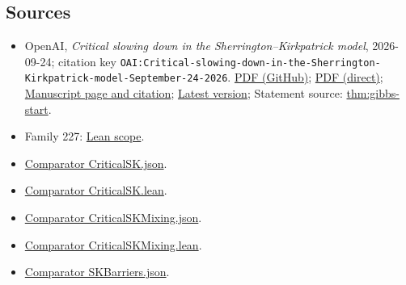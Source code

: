 \documentclass[11pt]{article}
\begin{document}
\subsection{Sources}
\begin{itemize}
\item OpenAI, \emph{Critical slowing down in the Sherrington–Kirkpatrick model}, 2026-09-24; citation key \texttt{OAI:Critical-slowing-down-in-the-Sherrington-Kirkpatrick-model-September-24-2026}. \href{https://github.com/openai/math/blob/adc7f1241b42e322a6451854ab7e4b4c146bf78a/preprints/Critical-slowing-down-in-the-Sherrington-Kirkpatrick-model-September-24-2026/paper.pdf}{PDF (GitHub)}; \href{https://github.com/openai/math/raw/adc7f1241b42e322a6451854ab7e4b4c146bf78a/preprints/Critical-slowing-down-in-the-Sherrington-Kirkpatrick-model-September-24-2026/paper.pdf}{PDF (direct)}; \href{https://github.com/openai/math/blob/adc7f1241b42e322a6451854ab7e4b4c146bf78a/preprints/Critical-slowing-down-in-the-Sherrington-Kirkpatrick-model-September-24-2026/README.md}{Manuscript page and citation}; \href{https://github.com/openai/math/blob/main/preprints/Critical-slowing-down-in-the-Sherrington-Kirkpatrick-model-September-24-2026/paper.pdf}{Latest version}; Statement source: \href{https://github.com/openai/math/blob/adc7f1241b42e322a6451854ab7e4b4c146bf78a/preprints/Critical-slowing-down-in-the-Sherrington-Kirkpatrick-model-September-24-2026/build/sections/introduction.tex\#L37}{thm:gibbs-start}.
\item Family 227: \href{https://github.com/openai/math/blob/adc7f1241b42e322a6451854ab7e4b4c146bf78a/lean/docs/227.md}{Lean scope}.
\item \href{https://github.com/openai/math/blob/adc7f1241b42e322a6451854ab7e4b4c146bf78a/lean/ComparatorChallenges/CriticalSK.json}{Comparator CriticalSK.json}.
\item \href{https://github.com/openai/math/blob/adc7f1241b42e322a6451854ab7e4b4c146bf78a/lean/ComparatorChallenges/CriticalSK.lean}{Comparator CriticalSK.lean}.
\item \href{https://github.com/openai/math/blob/adc7f1241b42e322a6451854ab7e4b4c146bf78a/lean/ComparatorChallenges/CriticalSKMixing.json}{Comparator CriticalSKMixing.json}.
\item \href{https://github.com/openai/math/blob/adc7f1241b42e322a6451854ab7e4b4c146bf78a/lean/ComparatorChallenges/CriticalSKMixing.lean}{Comparator CriticalSKMixing.lean}.
\item \href{https://github.com/openai/math/blob/adc7f1241b42e322a6451854ab7e4b4c146bf78a/lean/ComparatorChallenges/SKBarriers.json}{Comparator SKBarriers.json}.

\end{itemize}
\end{document}

